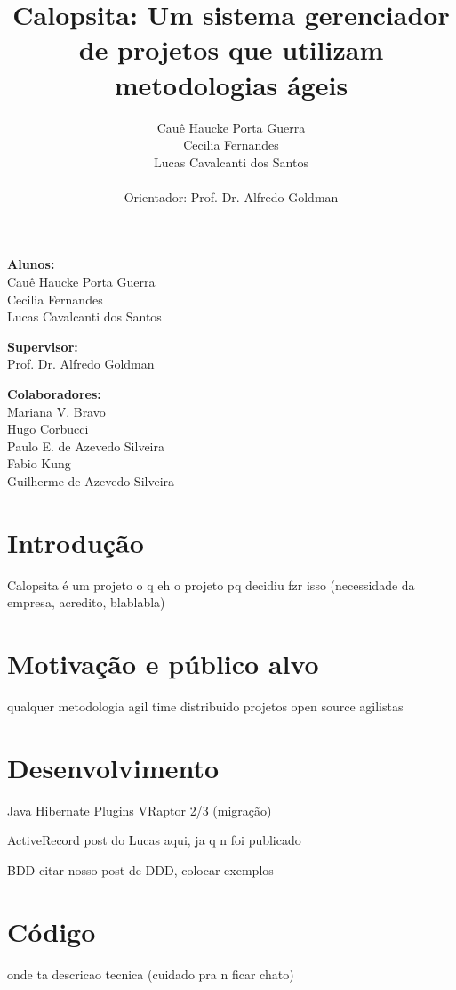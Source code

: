\documentclass[titlepage,a4paper]{article}
\title{Calopsita: Um sistema gerenciador de projetos que utilizam metodologias ágeis}
\author{Cauê Haucke Porta Guerra\\Cecilia Fernandes\\Lucas Cavalcanti dos Santos\\ \\Orientador: Prof. Dr. Alfredo Goldman}
\begin{document}
\maketitle

\begin{description} 
\item{\textbf{Alunos:}\\Cauê Haucke Porta Guerra\\Cecilia Fernandes\\Lucas Cavalcanti dos Santos}
\item{\textbf{Supervisor:}\\Prof. Dr. Alfredo Goldman}
\item{\textbf{Colaboradores:}\\Mariana V. Bravo\\Hugo Corbucci\\Paulo E. de Azevedo Silveira\\Fabio Kung\\Guilherme de Azevedo Silveira}
\end{description}

\section{Introdução}

Calopsita é um projeto
o q eh o projeto
pq decidiu fzr isso (necessidade da empresa, acredito, blablabla)


\section{Motivação e público alvo}

qualquer metodologia agil
time distribuido
projetos open source
agilistas

\section{Desenvolvimento}
Java
Hibernate
Plugins
VRaptor 2/3 (migração)

ActiveRecord
post do Lucas aqui, ja q n foi publicado

BDD
citar nosso post de DDD, colocar exemplos

\section{Código}

onde ta
descricao tecnica (cuidado pra n ficar chato)
\end{document}

